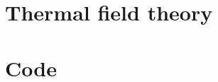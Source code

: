 \documentclass{book}
\begin{document}
    \chapter{Thermal field theory}
    \label{chapter: thermal field theory}
    
    
    
    
    
    
    
    \chapter{Code}
    

    \printbibliography
\end{document}
